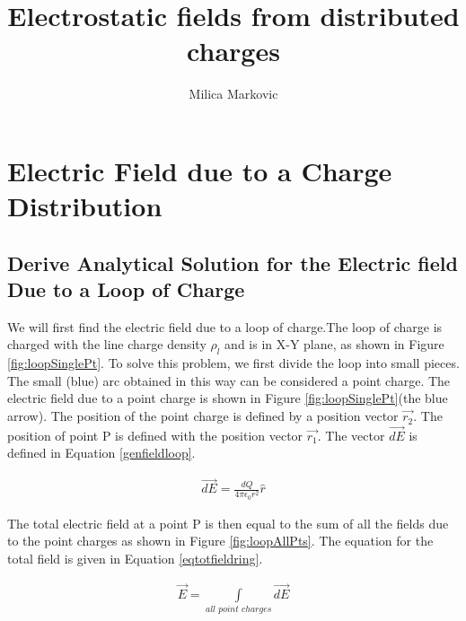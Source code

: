 \documentclass{ximera}
\title{Electrostatic fields from distributed charges}
\author{Milica Markovic}
\begin{document}
  
\begin{abstract}  

\end{abstract}  
\maketitle    


\section{Electric Field due to a Charge Distribution}

\subsection{Derive Analytical Solution for the Electric field Due to a Loop of Charge }



We will first find the electric field due to a loop of charge.The loop of charge is charged with the line charge density $\rho_l$ and is in X-Y plane, as shown in Figure \ref{fig:loopSinglePt}.  To solve this problem, we first  divide the loop into small pieces. The small (blue) arc obtained in this way can be considered a point charge. The electric field due to a point charge is shown in Figure \ref{fig:loopSinglePt}(the blue arrow).  The position of the point charge is defined by a position vector $\vec{r_2}$. The position of point P is defined with the position vector  $\vec{r_1}$. The vector  $\vec{dE}$ is defined in  Equation  \ref{genfieldloop}.


\begin{eqnarray}
\vec{dE}=\frac{dQ}{4 \pi \epsilon_{0} {r}^2} \hat{r} \label{genfieldloop}
\end{eqnarray}


The total electric field at a point P is then equal to the sum of all the fields due to the point charges as shown in Figure \ref{fig:loopAllPts}. The equation for the total field is given in Equation \ref{eqtotfieldring}. 

\begin{eqnarray}
\vec{E}=\int\limits_{all \,\, point \,\, charges} \vec{dE} \label{eqtotfieldring}
\end{eqnarray}


\end{document}
